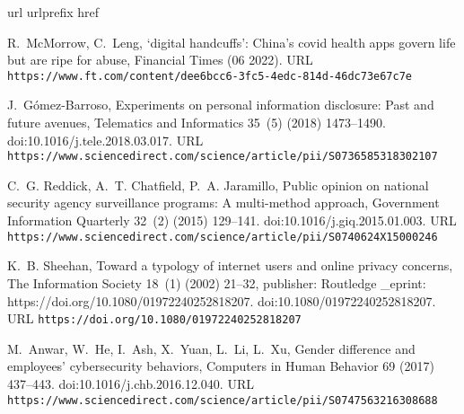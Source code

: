 \documentclass[
  number]{elsarticle}
\begin{document}
\renewcommand{\bibsection}{}
\begin{thebibliography}{10}
\expandafter\ifx\csname url\endcsname\relax
  \def\url#1{\texttt{#1}}\fi
\expandafter\ifx\csname urlprefix\endcsname\relax\def\urlprefix{URL }\fi
\expandafter\ifx\csname href\endcsname\relax
  \def\href#1#2{#2} \def\path#1{#1}\fi

R.~McMorrow, C.~Leng, \href{https://www.ft.com/content/dee6bcc6-3fc5-4edc-814d-46dc73e67c7e}{{\textquoteleft}digital handcuffs{\textquoteright}: China{\textquoteright}s covid health apps govern life but are ripe for abuse}, Financial Times (06 2022).
\newline\urlprefix\url{https://www.ft.com/content/dee6bcc6-3fc5-4edc-814d-46dc73e67c7e}

J.~{Gómez-Barroso}, \href{https://www.sciencedirect.com/science/article/pii/S0736585318302107}{Experiments on personal information disclosure: Past and future avenues}, Telematics and Informatics 35~(5) (2018) 1473--1490.
\newblock \href {https://doi.org/10.1016/j.tele.2018.03.017} {\path{doi:10.1016/j.tele.2018.03.017}}.
\newline\urlprefix\url{https://www.sciencedirect.com/science/article/pii/S0736585318302107}

C.~G. Reddick, A.~T. Chatfield, P.~A. Jaramillo, \href{https://www.sciencedirect.com/science/article/pii/S0740624X15000246}{Public opinion on national security agency surveillance programs: A multi-method approach}, Government Information Quarterly 32~(2) (2015) 129--141.
\newblock \href {https://doi.org/10.1016/j.giq.2015.01.003} {\path{doi:10.1016/j.giq.2015.01.003}}.
\newline\urlprefix\url{https://www.sciencedirect.com/science/article/pii/S0740624X15000246}

K.~B. Sheehan, \href{https://doi.org/10.1080/01972240252818207}{Toward a typology of internet users and online privacy concerns}, The Information Society 18~(1) (2002) 21--32, publisher: Routledge {\_}eprint: https://doi.org/10.1080/01972240252818207.
\newblock \href {https://doi.org/10.1080/01972240252818207} {\path{doi:10.1080/01972240252818207}}.
\newline\urlprefix\url{https://doi.org/10.1080/01972240252818207}

M.~Anwar, W.~He, I.~Ash, X.~Yuan, L.~Li, L.~Xu, \href{https://www.sciencedirect.com/science/article/pii/S0747563216308688}{Gender difference and employees' cybersecurity behaviors}, Computers in Human Behavior 69 (2017) 437--443.
\newblock \href {https://doi.org/10.1016/j.chb.2016.12.040} {\path{doi:10.1016/j.chb.2016.12.040}}.
\newline\urlprefix\url{https://www.sciencedirect.com/science/article/pii/S0747563216308688}


\end{thebibliography}
\end{document}
